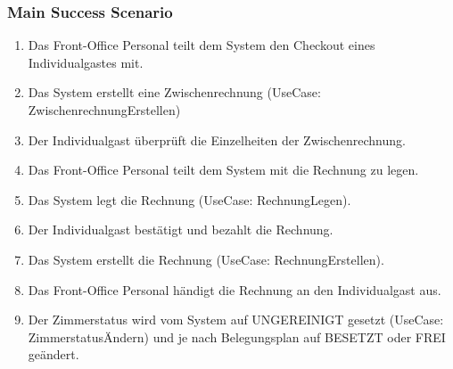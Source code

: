 \documentclass[./detailed_overview_usecases.tex]{subfiles}
\begin{document}
    \subsubsection*{Main Success Scenario}
    \begin{enumerate}
        \item Das Front-Office Personal teilt dem System den Checkout eines Individualgastes mit.
        \item Das System erstellt eine Zwischenrechnung (UseCase: ZwischenrechnungErstellen)
        \item Der Individualgast überprüft die Einzelheiten der Zwischenrechnung.
        \item Das Front-Office Personal teilt dem System mit die Rechnung zu legen.
        \item Das System legt die Rechnung (UseCase: RechnungLegen).
        \item Der Individualgast bestätigt und bezahlt die Rechnung.
        \item Das System erstellt die Rechnung (UseCase: RechnungErstellen).
        \item Das Front-Office Personal händigt die Rechnung an den Individualgast aus.
        \item Der Zimmerstatus wird vom System auf UNGEREINIGT gesetzt (UseCase: ZimmerstatusÄndern) und je nach
        Belegungsplan auf BESETZT oder FREI geändert.
    \end{enumerate}
\end{document}
